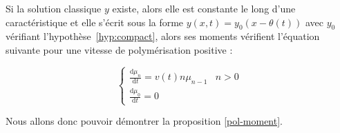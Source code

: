 \documentclass[a4paper]{article}
\begin{document}
Si la solution classique $y$ existe, alors elle est constante le long d'une caractéristique et  elle s'écrit sous la forme $y(x,t) = y_0(x- \theta(t))$ 
avec $y_0$ vérifiant l'hypothèse~\eqref{hyp:compact}, 
alors ses moments vérifient l'équation suivante pour une vitesse de polymérisation positive :

\begin{equation}
	\label{mmt}
\begin{cases}
\displaystyle \frac{\mathrm{d} \mu_n }{\mathrm{d}t} = v(t) n \mu_{n-1} & n>0 \\
\displaystyle \frac{\mathrm{d} \mu_0 }{\mathrm{d}t} = 0
\end{cases}
\end{equation}


Nous allons donc pouvoir démontrer la proposition \ref{pol-moment}.
\end{document}
